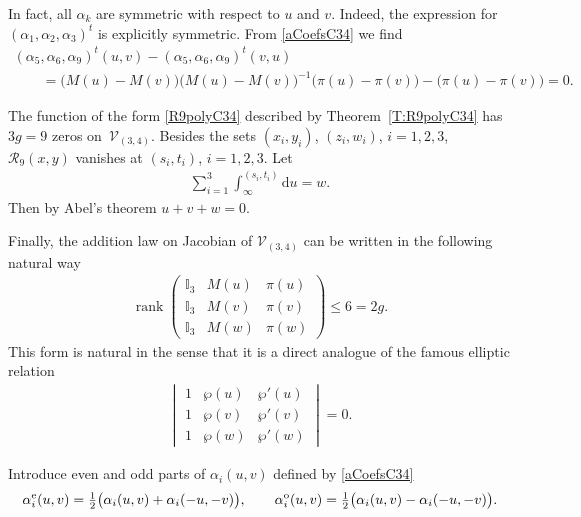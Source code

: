 \documentclass[pdftex]{sigma}
\numberwithin{equation}{section}
\DeclareMathOperator{\rank}{rank}
\DeclareMathOperator{\Ibb}{\mathbb{I}}
\newcommand{\rmd}{\mathrm{d}}
\begin{document}
\begin{Remark} In fact, all $\alpha_k$ are symmetric with respect to $u$ and $v$. Indeed, the expression for $(\alpha_1,\alpha_2,\alpha_3)^t$ is explicitly symmetric. From \eqref{aCoefsC34} we find
\begin{gather*}
 (\alpha_5,\alpha_6,\alpha_9)^t(u,v)- (\alpha_5,\alpha_6,\alpha_9)^t(v,u ) \\
 \qquad{} = \big(M(u)-M(v)\big)\big(M(u)-M(v)\big)^{-1}\big(\pi(u)-\pi(v)\big) - \big(\pi(u) - \pi(v)\big) = 0.
\end{gather*}
\end{Remark}
\begin{Remark}\label{R:NatAddF} The function of the form \eqref{R9polyC34} described by Theorem~\ref{T:R9polyC34} has $3g=9$ zeros on~$\mathcal{V}_{(3,4)}$. Besides the sets $(x_i,y_i)$, $(z_i,w_i)$, $i=1,2,3$, $\mathcal{R}_9(x,y)$ vanishes at $(s_i,t_i)$, $i=1,2,3$. Let
\begin{gather*}
 \sum_{i=1}^3 \int_{\infty}^{(s_i,t_i)} \rmd u = w.
\end{gather*}
Then by Abel's theorem $u+v+w=0$.

Finally, the addition law on Jacobian of $\mathcal{V}_{(3,4)}$ can be written in the following natural way
 \begin{gather*}
 \rank \begin{pmatrix} \Ibb_3 & M(u) & \pi(u)\\
 \Ibb_3 & M(v) & \pi(v) \\
 \Ibb_3 & M(w) & \pi(w) \end{pmatrix} {\leqslant 6 = 2g.}
 \end{gather*}
This form is natural in the sense that it is a direct analogue of the famous elliptic relation
 \begin{gather*}
 \begin{vmatrix} 1 & \wp(u) & \wp'(u)\\
 1 & \wp(v) & \wp'(v) \\
 1 & \wp(w) & \wp'(w) \end{vmatrix} =0.
 \end{gather*}
\end{Remark}

Introduce even and odd parts of $\alpha_i(u,v)$ defined by \eqref{aCoefsC34}
\begin{gather*}
 \alpha_i^{{\rm e}}(u,v) = \tfrac{1}{2}\big(\alpha_i(u,v)+\alpha_i(-u,-v)\big),\qquad \alpha_i^{{\rm o}}(u,v) = \tfrac{1}{2}\big(\alpha_i(u,v)-\alpha_i(-u,-v)\big).
\end{gather*}
\end{document}
